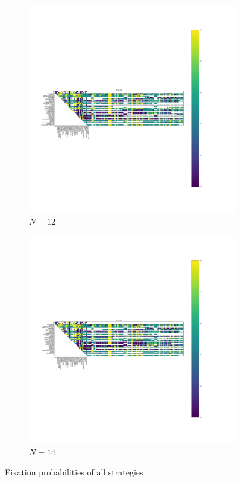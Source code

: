\documentclass{article}
\begin{document}
\begin{figure}[!hbtp]
\begin{subfigure}[t]{.3\textwidth}
        \centering
        \includegraphics[width=.8\textwidth]{../img/fixation_heatmap_12_std.pdf}
        \caption{\(N=12\)}
    \end{subfigure}%

    \begin{subfigure}[t]{.3\textwidth}
        \centering
        \includegraphics[width=.8\textwidth]{../img/fixation_heatmap_14_std.pdf}
        \caption{\(N=14\)}
    \end{subfigure}%
    \caption{Fixation probabilities of all strategies}
    \label{fig:fixation_heatmap_std}
\end{figure}
\end{document}
